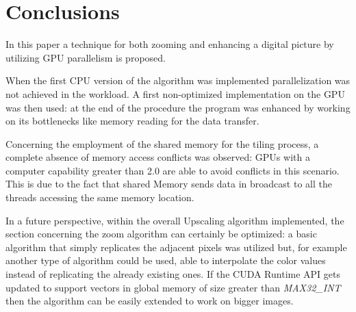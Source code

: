 \section{Conclusions}

In this paper a technique for both zooming and enhancing a digital picture by utilizing GPU parallelism is proposed.

When the first CPU version of the algorithm was implemented parallelization was not achieved in the workload. 
A first non-optimized implementation on the GPU was then used: at the end of the procedure the program was enhanced by working on its bottlenecks 
like memory reading for the data transfer.

Concerning the employment of the shared memory for the tiling process, a complete absence of memory access conflicts was observed: 
GPUs with a computer capability greater than 2.0 are able to avoid conflicts in this scenario. 
This is due to the fact that shared Memory sends data in broadcast to all the threads accessing the same memory location.

In a future perspective, within the overall Upscaling algorithm implemented, the section concerning the zoom algorithm can certainly be optimized: 
a basic algorithm that simply replicates the adjacent pixels was utilized but, for example
another type of algorithm could be used, able to interpolate the color values instead of replicating the already existing ones.
If the CUDA Runtime API gets updated to support vectors in global memory of size greater than \textit{MAX32\_INT} 
then the algorithm can be easily extended to work on bigger images.
